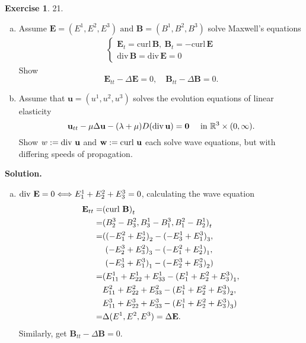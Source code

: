 \documentclass[a4paper]{book}
\newenvironment{solution}%
{\noindent\textbf{Solution.}}%
{\qedhere}
\numberwithin{equation}{chapter}
\theoremstyle{definition}
\newtheorem{exc}[exm]{Exercise}
\begin{document}
\begin{multicols}{2}
\begin{exc}
  21.
  \begin{enumerate} [(a)]
  \item Assume $\mathbf{E} = (E^1, E^2, E^3) \text{ and } \mathbf{B} = (B^1, B^2, B^3)$ solve Maxwell's equations
    \begin{align}
      \begin{cases}
        \mathbf{E}_t = \mathrm{curl} \, \mathbf{B}, \ \mathbf{B}_t = - \mathrm{curl} \, \mathbf{E} \\
        \mathrm{div} \, \mathbf{B} = \mathrm{div} \, \mathbf{E} = 0
      \end{cases}
    \end{align}
    Show
    \begin{equation*}
      \mathbf{E}_{tt} - \Delta \mathbf{E} = 0, \quad \mathbf{B}_{tt} - \Delta \mathbf{B} = 0.
    \end{equation*}

  \item Assume that $\mathbf{u} = (u^1, u^2, u^3)$ solves the evolution equations of linear elasticity 
    \begin{equation}
      \label{eq:4}
      \mathbf{u}_{tt} - \mu \Delta \mathbf{u} - (\lambda + \mu) D(\mathrm{div}\, \mathbf{u}) = \mathbf{0} \quad \textmd{ in } \mathbb{R}^3 \times (0, \infty). 
    \end{equation}
    Show $w := \textmd{div } \mathbf{u}$ and $\mathbf{w} := \textmd{curl } \mathbf{u}$ each solve wave equations, but with differing speeds of propagation.
  \end{enumerate}
\end{exc}

\begin{solution}
  \begin{enumerate} [(a)]
  \item $\textmd{div } \mathbf{E} = 0 \Longleftrightarrow E^1_1 + E^2_2 + E^3_3 = 0$, calculating the wave equation  
    \begin{align*}
      \mathbf{E}_{tt} = &{(\textmd{curl } \mathbf{B})}_t \\
      = &{(B^3_2 - B^2_3, B^1_3 - B^3_1, B^2_1 - B^1_2)}_t \\
      = &({(- E^2_1 + E^1_2)}_2 - {(- E^1_3 + E^3_1)}_3,  \\
                        &\ {(- E^3_2 + E^2_3)}_3 - {(- E^2_1 + E^1_2)}_1,  \\
                        &\ {(- E^1_3 + E^3_1)}_1 - {(- E^3_2 + E^2_3)}_2)  \\
      = &(E^1_{11} + E^1_{22} + E^1_{33} - {(E^1_1 + E^2_2 + E^3_3)}_1,  \\
                        & E^2_{11} + E^2_{22} + E^2_{33} - {(E^1_1 + E^2_2 + E^3_3)}_2,  \\
                        & E^3_{11} + E^3_{22} + E^3_{33} - {(E^1_1 + E^2_2 + E^3_3)}_3)  \\
      = & \Delta (E^1, E^2, E^3) = \Delta \mathbf{E}.
    \end{align*}
    Similarly, get $\mathbf{B}_{tt} - \Delta \mathbf{B} = 0$.


\end{enumerate}
\end{solution}
\end{multicols}
\end{document}
